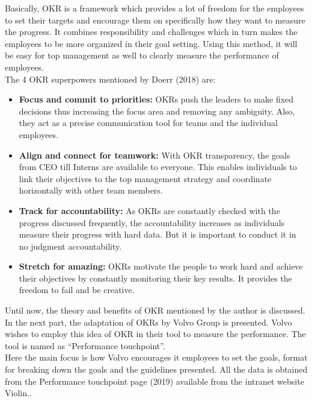 Basically, OKR is a framework which provides a lot of freedom for the employees to set their targets and encourage them on specifically how they want to measure the progress. It combines responsibility and challenges which in turn makes the employees to be more organized in their goal setting. Using this method, it will be easy for top management as well to clearly measure the performance of employees.\\

The 4 OKR superpowers mentioned by Doerr (2018) are:\\

\begin{itemize}
    \item \textbf{Focus and commit to priorities:}
    OKRs push the leaders to make fixed decisions thus increasing the focus area and removing any ambiguity. Also, they act as a precise communication tool for teams and the individual employees.\\

    \item \textbf{Align and connect for teamwork:}
    With OKR transparency, the goals from CEO till Interns are available to everyone. This enables individuals to link their objectives to the top management strategy and coordinate horizontally with other team members.\\

    \item \textbf{Track for accountability:}
    As OKRs are constantly checked with the progress discussed frequently, the accountability increases as individuals measure their progress with hard data. But it is important to conduct it in no judgment accountability.\\

    \item \textbf{Stretch for amazing:}
    OKRs motivate the people to work hard and achieve their objectives by constantly monitoring their key results. It provides the freedom to fail and be creative.\\
\end{itemize}

Until now, the theory and benefits of OKR mentioned by the author is discussed. In the next part, the adaptation of OKRs by Volvo Group is presented. Volvo wishes to employ this idea of OKR in their tool to measure the performance. The tool is named as “Performance touchpoint”.\\

Here the main focus is how Volvo encourages it employees to set the goals, format for breaking down the goals and the guidelines presented. All the data is obtained from the Performance touchpoint page (2019) available from the intranet website Violin..\\

